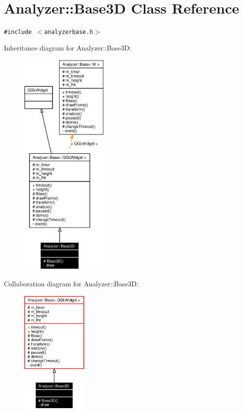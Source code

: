 \section{Analyzer::Base3D Class Reference}
\label{classAnalyzer_1_1Base3D}
{\tt \#include $<$analyzerbase.h$>$}

Inheritance diagram for Analyzer::Base3D:\begin{figure}[H]
\begin{center}
\leavevmode
\includegraphics[width=125pt]{classAnalyzer_1_1Base3D__inherit__graph}
\end{center}
\end{figure}
Collaboration diagram for Analyzer::Base3D:\begin{figure}[H]
\begin{center}
\leavevmode
\includegraphics[width=95pt]{classAnalyzer_1_1Base3D__coll__graph}
\end{center}
\end{figure}
